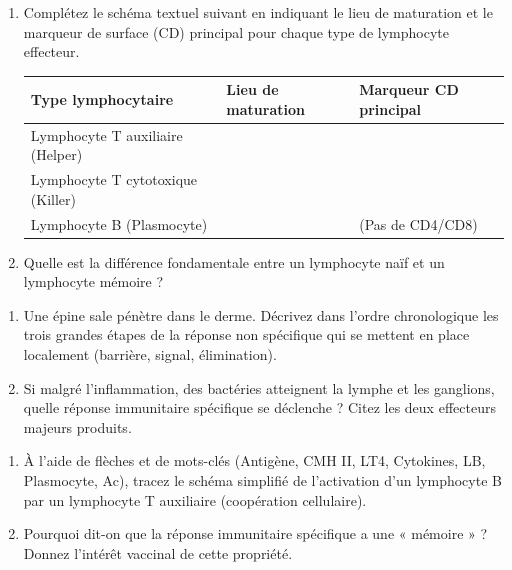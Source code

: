 \documentclass[11pt]{article}
\begin{document}
\begin{exercice}
\begin{enumerate}
    \item Complétez le schéma textuel suivant en indiquant le lieu de maturation et le marqueur de surface (CD) principal pour chaque type de lymphocyte effecteur.
    \begin{tabular}{|l|l|l|}
    \hline
    \textbf{Type lymphocytaire} & \textbf{Lieu de maturation} & \textbf{Marqueur CD principal} \\
    \hline
    Lymphocyte T auxiliaire (Helper) & & \\
    \hline
    Lymphocyte T cytotoxique (Killer) & & \\
    \hline
    Lymphocyte B (Plasmocyte) & & (Pas de CD4/CD8) \\
    \hline
    \end{tabular}
    \item Quelle est la différence fondamentale entre un lymphocyte naïf et un lymphocyte mémoire ?
\end{enumerate}
\end{exercice}

\begin{exercice}
\begin{enumerate}
    \item Une épine sale pénètre dans le derme. Décrivez dans l'ordre chronologique les trois grandes étapes de la réponse non spécifique qui se mettent en place localement (barrière, signal, élimination).
    \item Si malgré l'inflammation, des bactéries atteignent la lymphe et les ganglions, quelle réponse immunitaire spécifique se déclenche ? Citez les deux effecteurs majeurs produits.
\end{enumerate}
\end{exercice}

\begin{exercice}
\begin{enumerate}
    \item À l'aide de flèches et de mots-clés (Antigène, CMH II, LT4, Cytokines, LB, Plasmocyte, Ac), tracez le schéma simplifié de l'activation d'un lymphocyte B par un lymphocyte T auxiliaire (coopération cellulaire).
    \item Pourquoi dit-on que la réponse immunitaire spécifique a une « mémoire » ? Donnez l'intérêt vaccinal de cette propriété.
\end{enumerate}
\end{exercice}
\end{document}
